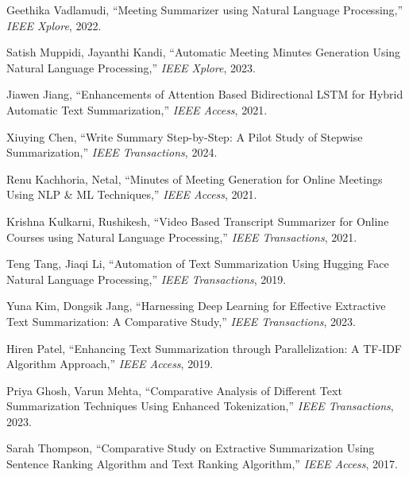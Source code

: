 \documentclass{article}
\begin{document}
\newpage

\begin{thebibliography}{}

Geethika Vadlamudi,
\newblock “Meeting Summarizer using Natural Language Processing,”
\newblock \emph{IEEE Xplore}, 2022.

Satish Muppidi, Jayanthi Kandi,
\newblock “Automatic Meeting Minutes Generation Using Natural Language Processing,”
\newblock \emph{IEEE Xplore}, 2023.

Jiawen Jiang,
\newblock “Enhancements of Attention Based Bidirectional LSTM for Hybrid Automatic Text Summarization,”
\newblock \emph{IEEE Access}, 2021.

Xiuying Chen,
\newblock “Write Summary Step-by-Step: A Pilot Study of Stepwise Summarization,”
\newblock \emph{IEEE Transactions}, 2024.

Renu Kachhoria, Netal,
\newblock “Minutes of Meeting Generation for Online Meetings Using NLP & ML Techniques,”
\newblock \emph{IEEE Access}, 2021.

Krishna Kulkarni, Rushikesh,
\newblock “Video Based Transcript Summarizer for Online Courses using Natural Language Processing,”
\newblock \emph{IEEE Transactions}, 2021.

Teng Tang, Jiaqi Li,
\newblock “Automation of Text Summarization Using Hugging Face Natural Language Processing,”
\newblock \emph{IEEE Transactions}, 2019.

Yuna Kim, Dongsik Jang,
\newblock “Harnessing Deep Learning for Effective Extractive Text Summarization: A Comparative Study,”
\newblock \emph{IEEE Transactions}, 2023.

Hiren Patel,
\newblock “Enhancing Text Summarization through Parallelization: A TF-IDF Algorithm Approach,”
\newblock \emph{IEEE Access}, 2019.

Priya Ghosh, Varun Mehta,
\newblock “Comparative Analysis of Different Text Summarization Techniques Using Enhanced Tokenization,”
\newblock \emph{IEEE Transactions}, 2023.

Sarah Thompson,
\newblock “Comparative Study on Extractive Summarization Using Sentence Ranking Algorithm and Text Ranking Algorithm,”
\newblock \emph{IEEE Access}, 2017.


\end{thebibliography}
\end{document}
